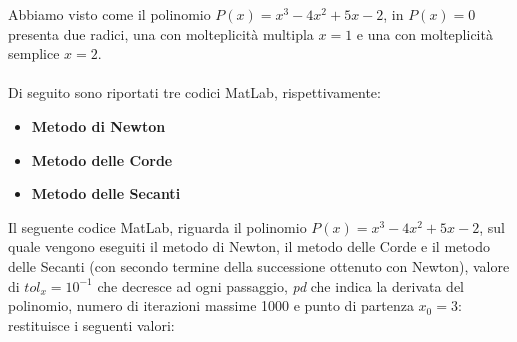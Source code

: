 Abbiamo visto come il polinomio $P(x) = x^3-4x^2+5x-2$, in $P(x)=0$ presenta due radici, una con molteplicità multipla $x=1$ e una con molteplicità semplice $x=2$.\\\\
Di seguito sono riportati tre codici MatLab, rispettivamente:
\begin{itemize}
\item \textbf{Metodo di Newton}

\item \textbf{Metodo delle Corde}

\item \textbf{Metodo delle Secanti}

\end{itemize}
Il seguente codice MatLab, riguarda il polinomio $P(x) = x^3-4x^2+5x-2$, sul quale vengono eseguiti il metodo di Newton, il metodo delle Corde e il metodo delle Secanti (con secondo termine della successione ottenuto con Newton), valore di $tol_x=10^{-1}$ che decresce ad ogni passaggio, \textit{pd} che indica la derivata del polinomio, numero di iterazioni massime 1000 e punto di partenza $x_{0}=3$:\\

restituisce i seguenti valori:\\
